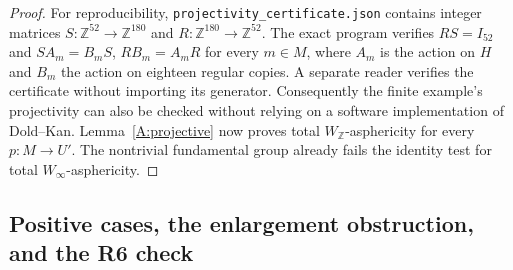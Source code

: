 \documentclass[11pt,a4paper]{article}
\theoremstyle{definition}
\theoremstyle{remark}
\newcommand{\Z}{\mathbb Z}
\newcommand{\Winfty}{W_\infty}
\newcommand{\WZ}{W_{\mathbb Z}}
\begin{document}
\begin{proof}
For reproducibility, \texttt{projectivity\_certificate.json} contains integer matrices $S:\Z^{52}\to\Z^{180}$ and $R:\Z^{180}\to\Z^{52}$. The exact program verifies $RS=I_{52}$ and $S A_m=B_mS$, $RB_m=A_mR$ for every $m\in M$, where $A_m$ is the action on $H$ and $B_m$ the action on eighteen regular copies. A separate reader verifies the certificate without importing its generator. Consequently the finite example's projectivity can also be checked without relying on a software implementation of Dold--Kan. Lemma~\ref{A:projective} now proves total $\WZ$-asphericity for every $p:M\to U'$. The nontrivial fundamental group already fails the identity test for total $\Winfty$-asphericity.
\end{proof}

\subsection{Positive cases, the enlargement obstruction, and the R6 check}
\end{document}
